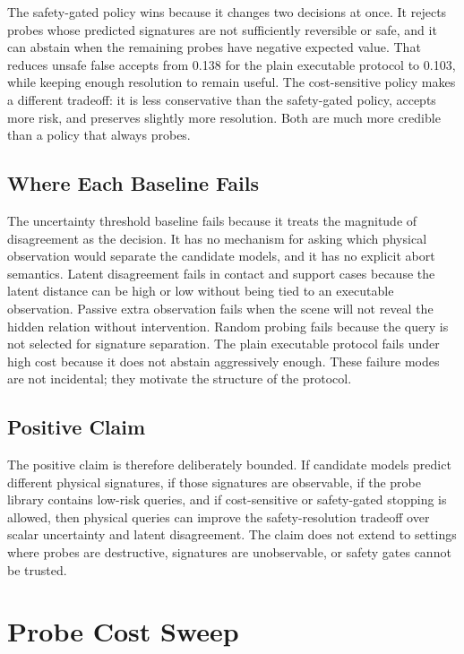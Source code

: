\documentclass{article}
\begin{document}
The safety-gated policy wins because it changes two decisions at once. It rejects probes whose predicted signatures are not sufficiently reversible or safe, and it can abstain when the remaining probes have negative expected value. That reduces unsafe false accepts from 0.138 for the plain executable protocol to 0.103, while keeping enough resolution to remain useful. The cost-sensitive policy makes a different tradeoff: it is less conservative than the safety-gated policy, accepts more risk, and preserves slightly more resolution. Both are much more credible than a policy that always probes.

\subsection{Where Each Baseline Fails}

The uncertainty threshold baseline fails because it treats the magnitude of disagreement as the decision. It has no mechanism for asking which physical observation would separate the candidate models, and it has no explicit abort semantics. Latent disagreement fails in contact and support cases because the latent distance can be high or low without being tied to an executable observation. Passive extra observation fails when the scene will not reveal the hidden relation without intervention. Random probing fails because the query is not selected for signature separation. The plain executable protocol fails under high cost because it does not abstain aggressively enough. These failure modes are not incidental; they motivate the structure of the protocol.

\subsection{Positive Claim}

The positive claim is therefore deliberately bounded. If candidate models predict different physical signatures, if those signatures are observable, if the probe library contains low-risk queries, and if cost-sensitive or safety-gated stopping is allowed, then physical queries can improve the safety-resolution tradeoff over scalar uncertainty and latent disagreement. The claim does not extend to settings where probes are destructive, signatures are unobservable, or safety gates cannot be trusted.

\section{Probe Cost Sweep}
\end{document}
